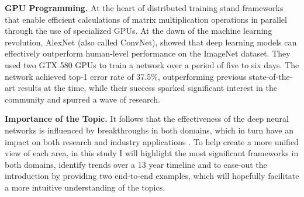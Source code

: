 \textbf{GPU Programming.}
At the heart of distributed training stand frameworks that enable efficient calculations of matrix
multiplication operations in parallel through the use of specialized GPUs. At the dawn of the
machine learning revolution, AlexNet \cite{krizhevsky_imagenet_2012} (also called ConvNet), showed
that deep learning models can effectively outperform human-level performance on the ImageNet
dataset. They used two GTX 580 GPUs to train a network over a period of five to six days. The
network achieved top-1 error rate of 37.5\%, outperforming previous state-of-the-art results at the
time, while their success sparked significant interest in the community and spurred a wave of
research.

\textbf{Importance of the Topic.}
It follows that the effectiveness of the deep neural networks is influenced by breakthroughs in both domains,
which in turn have an impact on both research and industry applications \cite{chahal_hitchhikers_2018, xing_strategies_2015}.
To help create a more unified view of each area, in this study I will highlight the most significant frameworks
in both domains, identify trends over a 13 year timeline and to ease-out the introduction by providing
two end-to-end examples, which will hopefully facilitate a more intuitive understanding of the topics.



